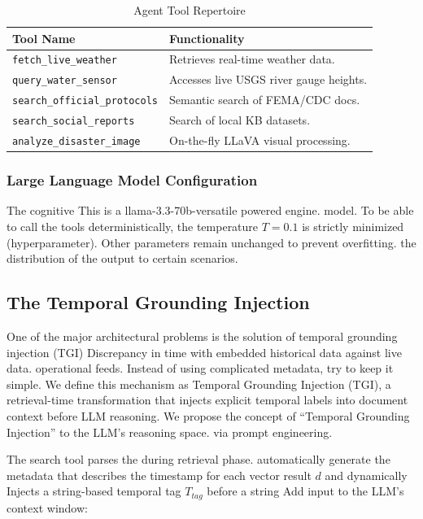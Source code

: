 \documentclass[conference]{IEEEtran}
\begin{document}
\begin{table}[htbp]
\centering
\caption{Agent Tool Repertoire}
\label{tab:tools}
\renewcommand{\arraystretch}{1.3}
\begin{tabular}{@{}ll@{}}
\toprule
\textbf{Tool Name} & \textbf{Functionality} \\ \midrule
\texttt{fetch\_live\_weather} & Retrieves real-time weather data. \\
\texttt{query\_water\_sensor} & Accesses live USGS river gauge heights. \\
\texttt{search\_official\_protocols} & Semantic search of FEMA/CDC docs. \\
\texttt{search\_social\_reports} & Search of local KB datasets. \\
\texttt{analyze\_disaster\_image} & On-the-fly LLaVA visual processing. \\ \bottomrule
\end{tabular}
\end{table}

\subsubsection{Large Language Model Configuration}
The cognitive This is a llama-3.3-70b-versatile powered engine. model. To be able to call the tools deterministically, the temperature $T = 0.1$ is strictly minimized (hyperparameter). Other parameters remain unchanged to prevent overfitting. the distribution of the output to certain scenarios.

\subsection{The Temporal Grounding Injection}
One of the major architectural problems is the solution of temporal grounding injection (TGI) Discrepancy in time with embedded historical data against live data. operational feeds. Instead of using complicated metadata, try to keep it simple. We define this mechanism as Temporal Grounding Injection (TGI), a 
retrieval-time transformation that injects explicit temporal labels into document context before LLM reasoning. We propose the concept of “Temporal Grounding Injection” to the LLM's reasoning space. via prompt engineering.

The search tool parses the during retrieval phase. automatically generate the metadata that describes the timestamp for each vector result $d$ and dynamically Injects a string-based temporal tag $T_{tag}$ before a string Add input to the LLM's context window:
\end{document}
